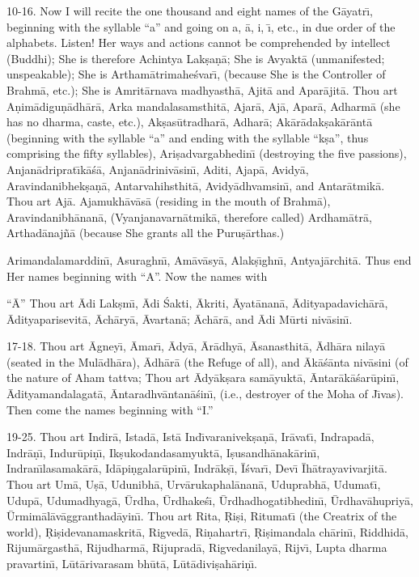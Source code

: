 10-16. Now I will recite the one thousand and eight names of the G\=ayatr\={\i}, beginning with the syllable ``a'' and going on a, \=a, i, \={\i}, etc., in due order of the alphabets. Listen! Her ways and actions cannot be comprehended by intellect (Buddhi); She is therefore Achintya Lak\d{s}a\d{n}\=a; She is Avyakt\=a (unmanifested; unspeakable); She is Artham\=atrimahe\'svar\={\i}, (because She is the Controller of Brahm\=a, etc.); She is Amrit\=arnava madhyasth\=a, Ajit\=a and Apar\=ajit\=a. Thou art A\d{n}im\=adigu\d{n}\=adh\=ar\=a, Arka mandalasamsthit\=a, Ajar\=a, Aj\=a, Apar\=a, Adharm\=a (she has no dharma, caste, etc.), Ak\d{s}as\=utradhar\=a, Adhar\=a; Ak\=ar\=adak\d{s}ak\=ar\=ant\=a (beginning with the syllable ``a'' and ending with the syllable ``k\d{s}a'', thus comprising the fifty syllables), Ari\d{s}advargabhedin\={\i} (destroying the five passions), Anjan\=adriprat\={\i}k\=a\'s\=a, Anjan\=adriniv\=asin\={\i}, Aditi, Ajap\=a, Avidy\=a, Aravindanibhek\d{s}a\d{n}\=a, Antarvahihsthit\=a, Avidy\=adhvamsin\={\i}, and Antar\=atmik\=a. Thou art Aj\=a. Ajamukh\=av\=as\=a (residing in the mouth of Brahm\=a), Aravindanibh\=anan\=a, (Vyanjanavarn\=atmik\=a, therefore called) Ardham\=atr\=a, Arthad\=anaj\~n\=a (because She grants all the Puru\d{s}\=arthas.)

Arimandalamarddin\={\i}, Asuraghn\={\i}, Am\=av\=asy\=a, Alak\d{s}\={\i}ghn\={\i}, Antyaj\=archit\=a. Thus end Her names beginning with ``A''. Now the names with

``\=A'' Thou art \=Adi Lak\d{s}m\={\i}, \=Adi \'Sakti, \=Akriti, \=Ayat\=anan\=a, \=Adityapadavich\=ar\=a, \=Adityaparisevit\=a, \=Ach\=ary\=a, \=Avartan\=a; \=Ach\=ar\=a, and \=Adi M\=urti niv\=asin\={\i}.

17-18. Thou art \=Agney\={\i}, \=Amar\={\i}, \=Ady\=a, \=Ar\=adhy\=a, \=Asanasthit\=a, \=Adh\=ara nilay\=a (seated in the Mul\=adh\=ara), \=Adh\=ar\=a (the Refuge of all), and \=Ak\=a\'s\=anta niv\=asini (of the nature of Aham tattva; Thou art \=Ady\=ak\d{s}ara sam\=ayukt\=a, \=Antar\=ak\=a\'sar\=upin\={\i}, \=Adityamandalagat\=a, \=Antaradhv\=antan\=a\'sin\={\i}, (i.e., destroyer of the Moha of J\={\i}vas). Then come the names beginning with ``I.''

19-25. Thou art Indir\=a, Istad\=a, Ist\=a Ind\={\i}varanivek\d{s}a\d{n}\=a, Ir\=avat\={\i}, Indrapad\=a, Indr\=a\d{n}\={\i}, Indur\=upi\d{n}\={\i}, Ik\d{s}ukodandasamyukt\=a, I\d{s}usandh\=anak\=arin\={\i}, Indran\={\i}lasamak\=ar\=a, Id\=api\d{n}galar\=upin\={\i}, Indr\=ak\d{s}\={\i}, \=I\'svar\={\i}, Dev\={\i} \=Ih\=atrayavivarjit\=a. Thou art Um\=a, U\d{s}\=a, Udunibh\=a, Urv\=arukaphal\=anan\=a, Uduprabh\=a, Udumat\={\i}, Udup\=a, Udumadhyag\=a, \=Urdha, \=Urdhake\'s\={\i}, \=Urdhadhogatibhedin\={\i}, \=Urdhav\=ahupriy\=a, \=Urmim\=al\=av\=aggranthad\=ayin\={\i}. Thou art Rita, \d{R}i\d{s}i, Ritumat\={\i} (the Creatrix of the world), \d{R}i\d{s}idevanamaskrit\=a, Rigved\=a, Ri\d{n}ahartr\={\i}, \d{R}i\d{s}imandala ch\=arin\={\i}, Riddhid\=a, Rijum\=argasth\=a, Rijudharm\=a, Rijuprad\=a, Rigvedanilay\=a, Rijv\={\i}, Lupta dharma pravartin\={\i}, L\=ut\=arivarasam bh\=ut\=a, L\=ut\=adivi\d{s}ah\=ari\d{n}\={\i}.

